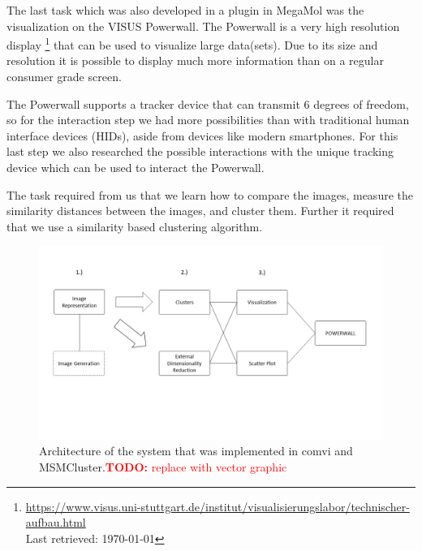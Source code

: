 \documentclass[journal]{vgtc}       %
\newcommand{\todo}[1]{\textcolor{red}{\textbf{TODO:} #1}}
\begin{document}
The last task which was also developed in a plugin in MegaMol was the visualization on the VISUS Powerwall. The Powerwall is a very high resolution display \footnote{\url{https://www.visus.uni-stuttgart.de/institut/visualisierungslabor/technischer-aufbau.html} \\ Last retrieved: \today } that can be used to visualize large data(sets). Due to its size and resolution it is possible to display much more information than on a regular consumer grade screen. 

The Powerwall supports a tracker device that can transmit 6 degrees of freedom, so for the interaction step we had more possibilities than with traditional human interface  devices  (HIDs), aside from devices like modern smartphones. For this last step we also researched the possible interactions with the unique tracking device  which can be used to interact the  Powerwall.

The task required from us that we learn how to compare the images, measure the similarity  distances between the images, and cluster them. Further it  required that we use a similarity based clustering algorithm.
\begin{figure}[htbp]
	\begin{center}
		\includegraphics[width=.75\linewidth]{Folie1}
	\end{center}
	\caption{\label{fig:arch} Architecture of the system that was implemented in comvi and MSMCluster.\todo{replace with vector graphic}}
\end{figure} 

\end{document}
